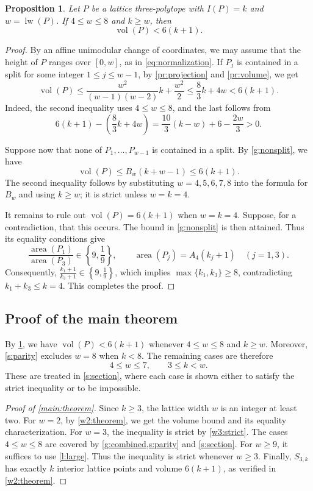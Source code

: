 \documentclass[reqno, 11pt]{article}
\numberwithin{equation}{section}
\newtheorem{proposition}[proposition]{Proposition}
\theoremstyle{definition}
\DeclareMathOperator{\vol}{vol}
\DeclareMathOperator{\lw}{lw}
\numberwithin{equation}{section}
\begin{document}
\begin{proposition}\label{g:combined}
Let $P$ be a lattice three-polytope with $I(P)=k$ and
$w=\lw(P)$. If $4\le w\le8$ and $k\ge w$, then
\[
 \vol(P)<6(k+1).
\]
\end{proposition}
\begin{proof}
By an affine unimodular change of coordinates, we may assume that the height of $P$ ranges over $[0,w]$, as in \eqref{eq:normalization}. If $P_j$ is contained in a split for some integer $1\le j\le w-1$, by \cref{pr:projection} and
\cref{pr:volume}, we get 
\[
 \vol(P)\le\frac{w^2}{(w-1)(w-2)}k+\frac{w^2}{2}
 \le\frac83k+4w<6(k+1).
\]
Indeed, the second inequality uses $4\le w\le8$, and the last
follows from
\[
 6(k+1)-\left(\frac83k+4w\right)
 =\frac{10}{3}(k-w)+6-\frac{2w}{3}>0.
\]

Suppose now that none of \(P_1,\ldots,P_{w-1}\) is contained in a split. By \cref{g:nonsplit}, we have 
\[
\operatorname{vol}(P)\le B_w(k+w-1)\le6(k+1).
\]
The second inequality follows by substituting \(w=4,5,6,7,8\) into the formula for \(B_w\) and using \(k\ge w\); it is strict unless \(w=k=4\).

It remains to rule out \(\operatorname{vol}(P)=6(k+1)\) when \(w=k=4\). Suppose, for a contradiction, that this occurs. The bound in \cref{g:nonsplit} is then attained. Thus its equality conditions give
\[
\frac{\operatorname{area}(P_1)}{\operatorname{area}(P_3)}
\in\left\{9,\frac{1}{9}\right\},
\qquad
\operatorname{area}(P_j)=A_4(k_j+1)
\quad(j=1,3).
\]
Consequently, $\frac{k_1+1}{k_3+1}\in\left\{9,\frac{1}{9}\right\}$, which implies \(\max\{k_1,k_3\}\ge8\), contradicting \(k_1+k_3\le k=4\). This completes the proof.
\end{proof}



\subsection{Proof of the main theorem}\label{sec:completion}

By \cref{g:combined}, we have \(\operatorname{vol}(P)<6(k+1)\) whenever \(4\le w\le8\) and \(k\ge w\). Moreover, \cref{s:parity} excludes \(w=8\) when \(k<8\). The remaining cases are therefore
\[
4\le w\le7,\qquad 3\le k<w.
\]
These are treated in \cref{s:section}, where each case is shown either to satisfy the strict inequality or to be impossible.

\begin{proof}[Proof of \cref{main:theorem}]
Since \(k\ge3\), the lattice width \(w\) is an integer at least two. For \(w=2\), by \cref{w2:theorem}, we get the volume bound and its equality characterization. For \(w=3\), the inequality is strict by \cref{w3:strict}. The cases \(4\le w\le8\) are covered by \cref{g:combined,s:parity} and \cref{s:section}. For \(w\ge9\), it suffices to use \cref{l:large}. Thus the inequality is strict whenever \(w\ge3\). Finally, \(S_{3,k}\) has exactly \(k\) interior lattice points and volume \(6(k+1)\), as verified in \cref{w2:theorem}.
\end{proof}
\end{document}
